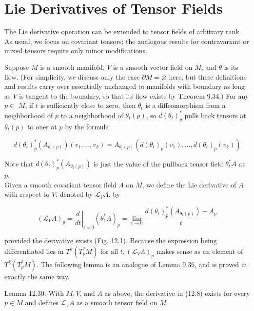 \documentclass[10pt, letterpaper]{article}
\begin{document}
\section*{Lie Derivatives of Tensor Fields}


The Lie derivative operation can be extended to tensor fields of arbitrary rank. As usual, we focus on covariant tensors; the analogous results for contravariant or mixed tensors require only minor modifications.

Suppose $M$ is a smooth manifold, $V$ is a smooth vector field on $M$, and $\theta$ is its flow. (For simplicity, we discuss only the case $\partial M=\varnothing$ here, but these definitions and results carry over essentially unchanged to manifolds with boundary as long as $V$ is tangent to the boundary, so that its flow exists by Theorem 9.34.) For any $p \in$ $M$, if $t$ is sufficiently close to zero, then $\theta_{t}$ is a diffeomorphism from a neighborhood of $p$ to a neighborhood of $\theta_{t}(p)$, so $d\left(\theta_{t}\right)_{p}^{*}$ pulls back tensors at $\theta_{t}(p)$ to ones at $p$ by the formula

$$
d\left(\theta_{t}\right)_{p}^{*}\left(A_{\theta_{t}(p)}\right)\left(v_{1}, \ldots, v_{k}\right)=A_{\theta_{t}(p)}\left(d\left(\theta_{t}\right)_{p}\left(v_{1}\right), \ldots, d\left(\theta_{t}\right)_{p}\left(v_{k}\right)\right)
$$

Note that $d\left(\theta_{t}\right)_{p}^{*}\left(A_{\theta_{t}(p)}\right)$ is just the value of the pullback tensor field $\theta_{t}^{*} A$ at $p$.\\
Given a smooth covariant tensor field $A$ on $M$, we define the Lie derivative of $A$ with respect to $V$, denoted by $\mathscr{L}_{V} A$, by

$$
\left(\mathscr{L}_{V} A\right)_{p}=\left.\frac{d}{d t}\right|_{t=0}\left(\theta_{t}^{*} A\right)_{p}=\lim _{t \rightarrow 0} \frac{d\left(\theta_{t}\right)_{p}^{*}\left(A_{\theta_{t}(p)}\right)-A_{p}}{t}
$$

provided the derivative exists (Fig. 12.1). Because the expression being differentiated lies in $T^{k}\left(T_{p}^{*} M\right)$ for all $t,\left(\mathscr{L}_{V} A\right)_{p}$ makes sense as an element of $T^{k}\left(T_{p}^{*} M\right)$. The following lemma is an analogue of Lemma 9.36, and is proved in exactly the same way.

Lemma 12.30. With $M, V$, and $A$ as above, the derivative in (12.8) exists for every $p \in M$ and defines $\mathscr{L}_{V} A$ as a smooth tensor field on $M$.
\end{document}
